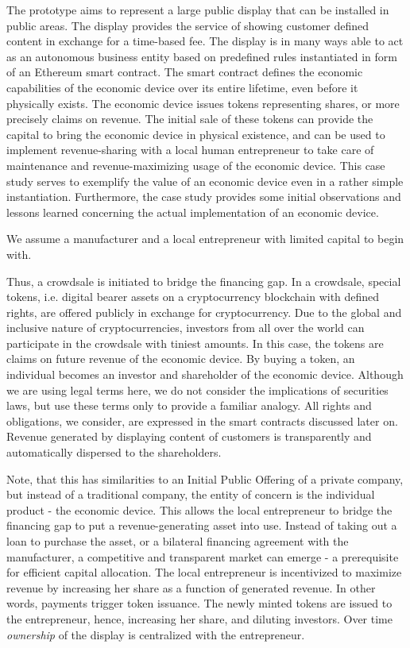 The prototype aims to represent a large public display that can be installed in public areas. The display provides the service of showing customer defined content in exchange for a time-based fee. The display is in many ways able to act as an autonomous business entity based on predefined rules instantiated in form of an Ethereum smart contract. The smart contract defines the economic capabilities of the economic device over its entire lifetime, even before it physically exists. The economic device issues tokens representing shares, or more precisely claims on revenue. The initial sale of these tokens can provide the capital to bring the economic device in physical existence, and can be used to implement revenue-sharing with a local human entrepreneur to take care of maintenance and revenue-maximizing usage of the economic device. This case study serves to exemplify the value of an economic device even in a rather simple instantiation. Furthermore, the case study provides some initial observations and lessons learned concerning the actual implementation of an economic device.

We assume a manufacturer and a local entrepreneur with limited capital to begin with. 


Thus, a crowdsale is initiated to bridge the financing gap. In a crowdsale, special tokens, i.e. digital bearer assets on a cryptocurrency blockchain with defined rights, are offered publicly in exchange for cryptocurrency. Due to the global and inclusive nature of cryptocurrencies, investors from all over the world can participate in the crowdsale with tiniest amounts. In this case, the tokens are claims on future revenue of the economic device. By buying a token, an individual becomes an investor and shareholder of the economic device. Although we are using legal terms here, we do not consider the implications of securities laws, but use these terms only to provide a familiar analogy. All rights and obligations, we consider, are expressed in the smart contracts discussed later on. Revenue generated by displaying content of customers is transparently and automatically dispersed to the shareholders. 

Note, that this has similarities to an Initial Public Offering of a private company, but instead of a traditional company, the entity of concern is the individual product - the economic device.
This allows the local entrepreneur to bridge the financing gap to put a revenue-generating asset into use. Instead of taking out a loan to purchase the asset, or a bilateral financing agreement with the manufacturer, a competitive and transparent market can emerge - a prerequisite for efficient capital allocation.
The local entrepreneur is incentivized to maximize revenue by increasing her share as a function of generated revenue. In other words, payments trigger token issuance. The newly minted tokens are issued to the entrepreneur, hence, increasing her share, and diluting investors. Over time \emph{ownership} of the display is centralized with the entrepreneur. 

